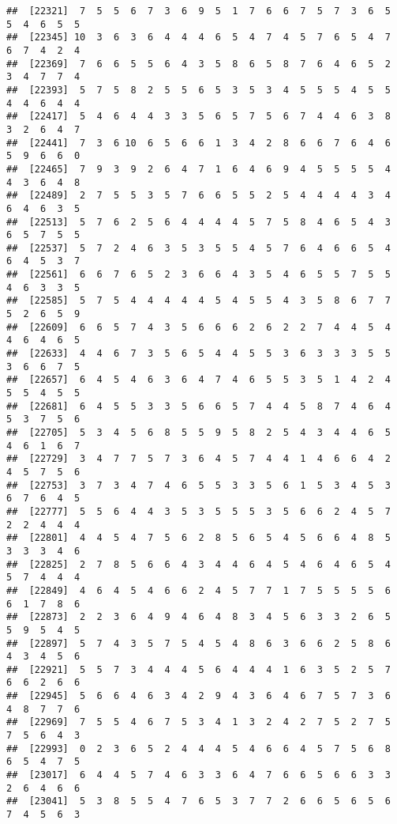 \documentclass[
]{book}
\begin{document}
\begin{verbatim}
##  [22321]  7  5  5  6  7  3  6  9  5  1  7  6  6  7  5  7  3  6  5  5  4  6  5  5
##  [22345] 10  3  6  3  6  4  4  4  6  5  4  7  4  5  7  6  5  4  7  6  7  4  2  4
##  [22369]  7  6  6  5  5  6  4  3  5  8  6  5  8  7  6  4  6  5  2  3  4  7  7  4
##  [22393]  5  7  5  8  2  5  5  6  5  3  5  3  4  5  5  5  4  5  5  4  4  6  4  4
##  [22417]  5  4  6  4  4  3  3  5  6  5  7  5  6  7  4  4  6  3  8  3  2  6  4  7
##  [22441]  7  3  6 10  6  5  6  6  1  3  4  2  8  6  6  7  6  4  6  5  9  6  6  0
##  [22465]  7  9  3  9  2  6  4  7  1  6  4  6  9  4  5  5  5  5  4  4  3  6  4  8
##  [22489]  2  7  5  5  3  5  7  6  6  5  5  2  5  4  4  4  4  3  4  6  4  6  3  5
##  [22513]  5  7  6  2  5  6  4  4  4  4  5  7  5  8  4  6  5  4  3  6  5  7  5  5
##  [22537]  5  7  2  4  6  3  5  3  5  5  4  5  7  6  4  6  6  5  4  6  4  5  3  7
##  [22561]  6  6  7  6  5  2  3  6  6  4  3  5  4  6  5  5  7  5  5  4  6  3  3  5
##  [22585]  5  7  5  4  4  4  4  4  5  4  5  5  4  3  5  8  6  7  7  5  2  6  5  9
##  [22609]  6  6  5  7  4  3  5  6  6  6  2  6  2  2  7  4  4  5  4  4  6  4  6  5
##  [22633]  4  4  6  7  3  5  6  5  4  4  5  5  3  6  3  3  3  5  5  3  6  6  7  5
##  [22657]  6  4  5  4  6  3  6  4  7  4  6  5  5  3  5  1  4  2  4  5  5  4  5  5
##  [22681]  6  4  5  5  3  3  5  6  6  5  7  4  4  5  8  7  4  6  4  5  3  7  5  6
##  [22705]  5  3  4  5  6  8  5  5  9  5  8  2  5  4  3  4  4  6  5  4  6  1  6  7
##  [22729]  3  4  7  7  5  7  3  6  4  5  7  4  4  1  4  6  6  4  2  4  5  7  5  6
##  [22753]  3  7  3  4  7  4  6  5  5  3  3  5  6  1  5  3  4  5  3  6  7  6  4  5
##  [22777]  5  5  6  4  4  3  5  3  5  5  5  3  5  6  6  2  4  5  7  2  2  4  4  4
##  [22801]  4  4  5  4  7  5  6  2  8  5  6  5  4  5  6  6  4  8  5  3  3  3  4  6
##  [22825]  2  7  8  5  6  6  4  3  4  4  6  4  5  4  6  4  6  5  4  5  7  4  4  4
##  [22849]  4  6  4  5  4  6  6  2  4  5  7  7  1  7  5  5  5  5  6  6  1  7  8  6
##  [22873]  2  2  3  6  4  9  4  6  4  8  3  4  5  6  3  3  2  6  5  5  9  5  4  5
##  [22897]  5  7  4  3  5  7  5  4  5  4  8  6  3  6  6  2  5  8  6  4  3  4  5  6
##  [22921]  5  5  7  3  4  4  4  5  6  4  4  4  1  6  3  5  2  5  7  6  6  2  6  6
##  [22945]  5  6  6  4  6  3  4  2  9  4  3  6  4  6  7  5  7  3  6  4  8  7  7  6
##  [22969]  7  5  5  4  6  7  5  3  4  1  3  2  4  2  7  5  2  7  5  7  5  6  4  3
##  [22993]  0  2  3  6  5  2  4  4  4  5  4  6  6  4  5  7  5  6  8  6  5  4  7  5
##  [23017]  6  4  4  5  7  4  6  3  3  6  4  7  6  6  5  6  6  3  3  2  6  4  6  6
##  [23041]  5  3  8  5  5  4  7  6  5  3  7  7  2  6  6  5  6  5  6  7  4  5  6  3

\end{verbatim}
\end{document}
